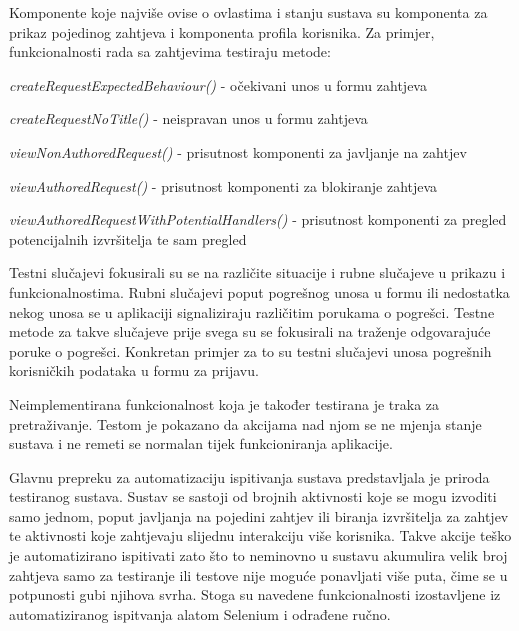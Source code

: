 			Komponente koje najviše ovise o ovlastima i stanju sustava su komponenta za prikaz pojedinog zahtjeva i komponenta profila korisnika.
			Za primjer, funkcionalnosti rada sa zahtjevima testiraju metode:
			\begin{packed_enum}
				
				\item \textit{createRequestExpectedBehaviour()} - očekivani unos u formu zahtjeva
				\item \textit{createRequestNoTitle()} - neispravan unos u formu zahtjeva
				\item \textit{viewNonAuthoredRequest()} - prisutnost komponenti za javljanje na zahtjev
				\item \textit{viewAuthoredRequest()} - prisutnost komponenti za blokiranje zahtjeva
				\item \textit{viewAuthoredRequestWithPotentialHandlers()} - prisutnost komponenti za pregled potencijalnih izvršitelja te sam pregled
				
			\end{packed_enum}
			
		
			
			Testni slučajevi fokusirali su se na različite situacije i rubne slučajeve u prikazu i funkcionalnostima.
			Rubni slučajevi poput pogrešnog unosa u formu ili nedostatka nekog unosa se u aplikaciji signaliziraju različitim porukama o pogrešci. 
			Testne metode za takve slučajeve prije svega su se fokusirali na traženje odgovarajuće poruke o pogrešci.
			Konkretan primjer za to su testni slučajevi unosa pogrešnih korisničkih podataka u formu za prijavu. \newline 
			
			Neimplementirana funkcionalnost koja je također testirana je traka za pretraživanje. 
			Testom je pokazano da akcijama nad njom se ne mjenja stanje sustava i ne remeti se normalan tijek funkcioniranja aplikacije. \newline
			
			Glavnu prepreku za automatizaciju ispitivanja sustava predstavljala je priroda testiranog sustava. 
			Sustav se sastoji od brojnih aktivnosti koje se mogu izvoditi samo jednom, poput javljanja na pojedini zahtjev ili 
			biranja izvršitelja za zahtjev te aktivnosti koje zahtjevaju slijednu interakciju više korisnika.
			Takve akcije teško je automatizirano ispitivati zato što to neminovno u sustavu akumulira velik broj zahtjeva samo za testiranje 
			ili testove nije moguće ponavljati više puta, čime se u potpunosti gubi njihova svrha.
			Stoga su navedene funkcionalnosti izostavljene iz automatiziranog ispitvanja alatom Selenium i odrađene ručno.
			
